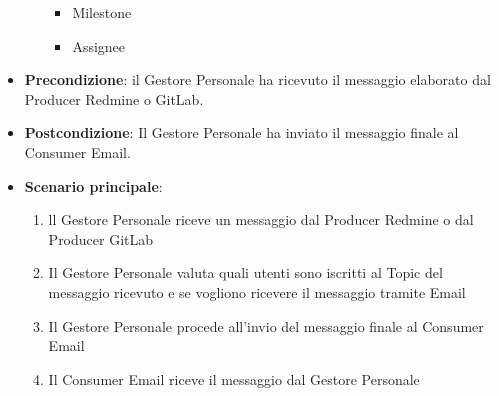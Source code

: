 \begin{itemize}
\begin{itemize}
\begin{itemize}
				\item Milestone
				\item Assignee
			\end{itemize}
		\end{itemize}
		\item \textbf{Precondizione}: il Gestore Personale ha ricevuto il messaggio elaborato dal Producer Redmine o GitLab.
		\item \textbf{Postcondizione}: Il Gestore Personale ha inviato il messaggio finale al Consumer Email.
		\item \textbf{Scenario principale}:
		\begin{enumerate}
			\item ll Gestore Personale riceve un messaggio dal Producer Redmine o dal Producer GitLab
			\item Il Gestore Personale valuta quali utenti sono iscritti al Topic del messaggio ricevuto e se vogliono ricevere il messaggio tramite Email
			\item Il Gestore Personale procede all'invio del messaggio finale al Consumer Email
            \item Il Consumer Email riceve il messaggio dal Gestore Personale
		\end{enumerate}
	\end{itemize}
